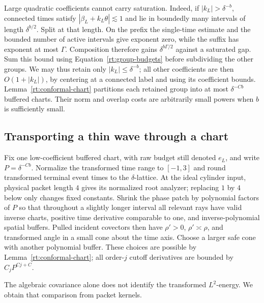 Large quadratic coefficients cannot carry saturation.  Indeed, if
$|k_L|>\delta^{-b}$, connected times satisfy
$|\beta_L+k_L\theta|\lesssim1$ and lie in boundedly many intervals of
length $\delta^{b/2}$.  Split at that length.  On the prefix the
single-time estimate and the bounded number of active intervals give
exponent zero, while the suffix has exponent at most $\Gamma$.
Composition therefore gains $\delta^{b\Gamma/2}$ against a saturated
gap.  Sum this bound using Equation~\eqref{rt:group-budgets} before
subdividing the other groups.  We may thus retain only
$|k_L|\le\delta^{-b}$; all other coefficients are then $O(1+|k_L|)$,
by centering at a connected label and using its coefficient bounds.
Lemma~\ref{rt:conformal-chart} partitions each retained group into at
most $\delta^{-Cb}$ buffered charts.  Their norm and overlap costs are
arbitrarily small powers when $b$ is sufficiently small.

\subsection{Transporting a thin wave through a chart}

Fix one low-coefficient buffered chart, with raw budget still denoted
$e_L$, and write $P=\delta^{-Cb}$.  Normalize the transformed time range
to $[-1,3]$ and round transformed terminal event times to the
$\delta$-lattice.  At the ideal cylinder input, physical packet length
$4$ gives its normalized root analyzer; replacing $1$ by $4$ below only
changes fixed constants.  Shrink the phase patch by polynomial factors
of $P$ so that throughout a slightly longer interval all relevant rays
have valid inverse charts, positive time derivative comparable to one,
and inverse-polynomial spatial buffers.  Pulled incident covectors then
have $\rho'>0$, $\rho'\asymp\rho$, and transformed angle in a small cone
about the time axis.  Choose a larger safe cone with another polynomial
buffer.  These choices are possible by Lemma~\ref{rt:conformal-chart};
all order-$j$ cutoff derivatives are bounded by $C_jP^{Cj+C}$.

The algebraic covariance alone does not identify the transformed
$L^2$-energy.  We obtain that comparison from packet kernels.

